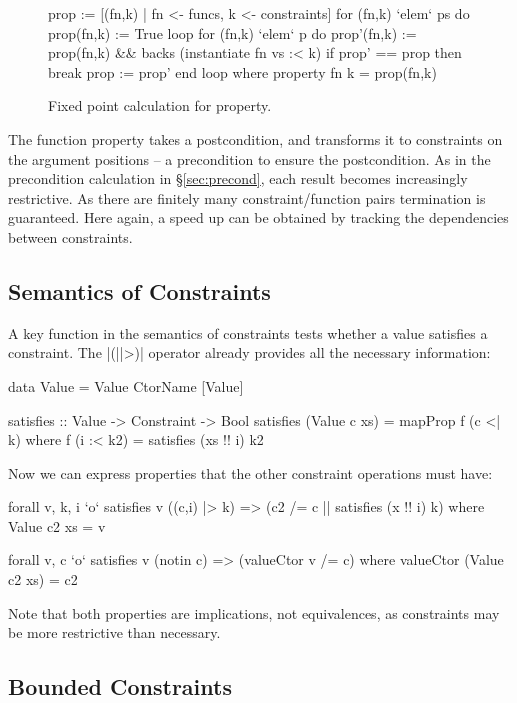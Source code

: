 \documentclass[preprint]{sigplanconf}
\newcommand{\C}[1]{\textsf{#1}}
\begin{document}
\begin{figure}
\begin{code}
prop := [(fn,k) | fn <- funcs, k <- constraints]
for (fn,k) `elem` ps do prop(fn,k) := True
loop
    for (fn,k) `elem` p do
        prop'(fn,k) := prop(fn,k) && backs (instantiate fn vs :< k)
    if prop' == prop then break
    prop := prop'
end loop
    where
        property fn k = prop(fn,k)
\end{code}
\caption{Fixed point calculation for \C{property}.}
\label{fig:property_fixp}
\end{figure}

The function \C{property} takes a postcondition, and transforms it to constraints on the argument positions -- a precondition to ensure the postcondition. As in the precondition calculation in \S\ref{sec:precond}, each result becomes increasingly restrictive. As there are finitely many constraint/function pairs termination is guaranteed. Here again, a speed up can be obtained by tracking the dependencies between constraints.

\subsection{Semantics of Constraints}

A key function in the semantics of constraints tests whether a value satisfies a constraint. The |(||>)| operator already provides all the necessary information:

\begin{code}
data Value = Value CtorName [Value]

satisfies :: Value -> Constraint -> Bool
satisfies (Value c xs) = mapProp f (c <| k)
    where f (i :< k2) = satisfies (xs !! i) k2
\end{code}

Now we can express properties that the other constraint operations must have:

\begin{code}
forall v, k, i  `o` satisfies v ((c,i) |> k)
                => (c2 /= c || satisfies (x !! i) k)
    where Value c2 xs = v

forall v, c `o` satisfies v (notin c) => (valueCtor v /= c)
    where valueCtor (Value c2 xs) = c2
\end{code}

\noindent Note that both properties are implications, not equivalences, as constraints may be more restrictive than necessary.

\subsection{Bounded Constraints}
\label{sec:bounded}
\end{document}
